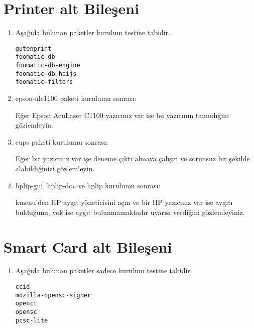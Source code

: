 \documentclass[a4paper,10pt]{article}
\begin{document}
\section{Printer alt Bileşeni}
\begin{enumerate}

\item Aşağıda bulunan paketler kurulum testine tabidir.
\begin{verbatim}
gutenprint 
foomatic-db
foomatic-db-engine
foomatic-db-hpijs
foomatic-filters
\end{verbatim}
\item epson-alc1100 paketi kurulumu sonrası:

Eğer Epson AcuLaser C1100 yazıcınız var ise bu yazıcının tanındığını gözlemleyin.

\item cups paketi kurulumu sonrası:

Eğer bir yazıcınız var işe deneme çıktı almaya çalışın ve sorunsuz bir şekilde alabildiğinizi gözlemleyin.

\item hplip-gui, hplip-doc ve hplip kurulumu sonrası:

kmenu'den HP aygıt yöneticisini açın ve bir HP yazıcınız var ise aygıtı bulduğunu, yok ise aygıt bulunmamaktadır uyarısı verdiğini gözlemleyiniz.
    
\end{enumerate}

\section{Smart Card alt Bileşeni}
\begin{enumerate}
 \item Aşağıda bulunan paketler sadece kurulum testine tabidir.
\begin{verbatim}
ccid 
mozilla-opensc-signer
openct
opensc
pcsc-lite
\end{verbatim}


\end{enumerate}
\end{document}
